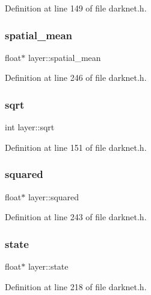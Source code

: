 Definition at line 149 of file darknet.\+h.

\mbox{\label{structlayer_ac3167d1999c93f60856076a4da9c3fc3}} 
\subsubsection{\texorpdfstring{spatial\_mean}{spatial\_mean}}
{\footnotesize\ttfamily float$\ast$ layer\+::spatial\+\_\+mean}



Definition at line 246 of file darknet.\+h.

\mbox{\label{structlayer_a30e95ebb753b16822e759bd903ca8f1a}} 
\subsubsection{\texorpdfstring{sqrt}{sqrt}}
{\footnotesize\ttfamily int layer\+::sqrt}



Definition at line 151 of file darknet.\+h.

\mbox{\label{structlayer_ae8ed52c73d5fc1d13d2fbf0b920dda7e}} 
\subsubsection{\texorpdfstring{squared}{squared}}
{\footnotesize\ttfamily float$\ast$ layer\+::squared}



Definition at line 243 of file darknet.\+h.

\mbox{\label{structlayer_af47d59ee97d2b512e5ca64a25af476c1}} 
\subsubsection{\texorpdfstring{state}{state}}
{\footnotesize\ttfamily float$\ast$ layer\+::state}



Definition at line 218 of file darknet.\+h.

